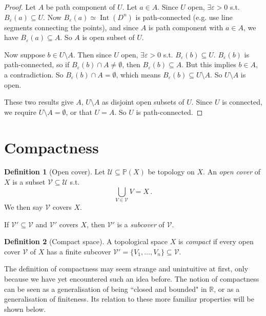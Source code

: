 \documentclass[a4paper,11pt]{article}
\theoremstyle{definition}
\newtheorem*{defn}{Definition}
\DeclareMathOperator{\Int}{Int}
\numberwithin{equation}{section}
\begin{document}
\begin{proof}
Let $A$ be path component of $U$. Let $a\in A$. Since $U$ open, $\exists\varepsilon>0$ s.t. $B_\varepsilon(a)\subseteq U$. Now $B_\varepsilon(a)\simeq\Int(D^n)$ is path-connected (e.g. use line segments connecting the points), and since $A$ is path component with $a\in A$, we have $B_\varepsilon(a)\subseteq A$. So $A$ is open subset of $U$.

Now suppose $b\in U\setminus A$. Then since $U$ open, $\exists\varepsilon>0$ s.t. $B_\varepsilon(b)\subseteq U$. $B_\varepsilon(b)$ is path-connected, so if $B_\varepsilon(b)\cap A\neq\emptyset$, then $B_\varepsilon(b)\subseteq A$. But this implies $b\in A$, a contradiction. So $B_\varepsilon(b)\cap A=\emptyset$, which means $B_\varepsilon(b)\subseteq U\setminus A$. So $U\setminus A$ is open.

These two results give $A$, $U\setminus A$ as disjoint open subsets of $U$. Since $U$ is connected, we require $U\setminus A=\emptyset$, or that $U=A$. So $U$ is path-connected.
\end{proof}

\section{Compactness}
\begin{defn}[Open cover]
    Let $\mathcal{U}\subseteq\mathbb{P}(X)$ be topology on $X$. An \emph{open cover} of $X$ is a subset $\mathcal{V}\subseteq\mathcal{U}$ s.t.
    \begin{equation}
        \bigcup_{V\in\mathcal{V}}V=X\,.
    \end{equation}
    We then say $\mathcal{V}$ covers $X$.
    
    If $\mathcal{V}'\subseteq\mathcal{V}$ and $\mathcal{V}'$ covers $X$, then $\mathcal{V}'$ is a \emph{subcover} of $\mathcal{V}$.
\end{defn}

\begin{defn}[Compact space]
    A topological space $X$ is \emph{compact} if every open cover $\mathcal{V}$ of $X$ has a finite subcover $\mathcal{V}'=\{V_1,...,V_n\}\subseteq\mathcal{V}$.
\end{defn}

The definition of compactness may seem strange and unintuitive at first, only because we have yet encountered such an idea before. The notion of compactness can be seen as a generalisation of being ``closed and bounded" in $\mathbb{R}$, or as a generalisation of finiteness. Its relation to these more familiar properties will be shown below.
\end{document}
